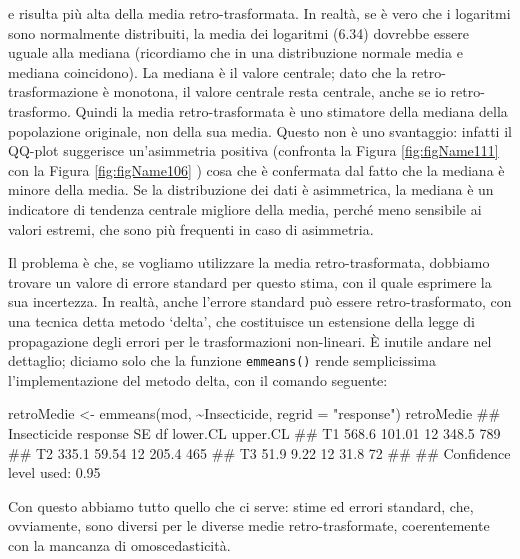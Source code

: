 \documentclass[a4paper,12pt,oneside]{book}
\newenvironment{Shaded}{\begin{snugshade}}{\end{snugshade}}
\newcommand{\SpecialCharTok}[1]{#1}
\newcommand{\StringTok}[1]{#1}
\newcommand{\DocumentationTok}[1]{#1}
\newcommand{\OtherTok}[1]{#1}
\newcommand{\FunctionTok}[1]{#1}
\newcommand{\AttributeTok}[1]{#1}
\newcommand{\NormalTok}[1]{#1}
\begin{document}
e risulta più alta della media retro-trasformata. In realtà, se è vero che i logaritmi sono normalmente distribuiti, la media dei logaritmi (6.34) dovrebbe essere uguale alla mediana (ricordiamo che in una distribuzione normale media e mediana coincidono). La mediana è il valore centrale; dato che la retro-trasformazione è monotona, il valore centrale resta centrale, anche se io retro-trasformo. Quindi la media retro-trasformata è uno stimatore della mediana della popolazione originale, non della sua media. Questo non è uno svantaggio: infatti il QQ-plot suggerisce un'asimmetria positiva (confronta la Figura \ref{fig:figName111} con la Figura \ref{fig:figName106} ) cosa che è confermata dal fatto che la mediana è minore della media. Se la distribuzione dei dati è asimmetrica, la mediana è un indicatore di tendenza centrale migliore della media, perché meno sensibile ai valori estremi, che sono più frequenti in caso di asimmetria.

Il problema è che, se vogliamo utilizzare la media retro-trasformata, dobbiamo trovare un valore di errore standard per questo stima, con il quale esprimere la sua incertezza. In realtà, anche l'errore standard può essere retro-trasformato, con una tecnica detta metodo `delta', che costituisce un estensione della legge di propagazione degli errori per le trasformazioni non-lineari. È inutile andare nel dettaglio; diciamo solo che la funzione \texttt{emmeans()} rende semplicissima l'implementazione del metodo delta, con il comando seguente:

\begin{Shaded}
\begin{Highlighting}[]
\NormalTok{retroMedie }\OtherTok{\textless{}{-}} \FunctionTok{emmeans}\NormalTok{(mod, }\SpecialCharTok{\textasciitilde{}}\NormalTok{Insecticide, }\AttributeTok{regrid =} \StringTok{"response"}\NormalTok{)}
\NormalTok{retroMedie}
\DocumentationTok{\#\#  Insecticide response     SE df lower.CL upper.CL}
\DocumentationTok{\#\#  T1             568.6 101.01 12    348.5      789}
\DocumentationTok{\#\#  T2             335.1  59.54 12    205.4      465}
\DocumentationTok{\#\#  T3              51.9   9.22 12     31.8       72}
\DocumentationTok{\#\# }
\DocumentationTok{\#\# Confidence level used: 0.95}
\end{Highlighting}
\end{Shaded}

Con questo abbiamo tutto quello che ci serve: stime ed errori standard, che, ovviamente, sono diversi per le diverse medie retro-trasformate, coerentemente con la mancanza di omoscedasticità.
\end{document}
